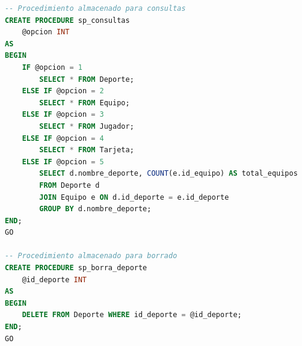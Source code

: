 \documentclass{article}
\begin{document}
\begin{lstlisting}[language=SQL]
-- Procedimiento almacenado para consultas
CREATE PROCEDURE sp_consultas
    @opcion INT
AS
BEGIN
    IF @opcion = 1
        SELECT * FROM Deporte;
    ELSE IF @opcion = 2
        SELECT * FROM Equipo;
    ELSE IF @opcion = 3
        SELECT * FROM Jugador;
    ELSE IF @opcion = 4
        SELECT * FROM Tarjeta;
    ELSE IF @opcion = 5
        SELECT d.nombre_deporte, COUNT(e.id_equipo) AS total_equipos
        FROM Deporte d
        JOIN Equipo e ON d.id_deporte = e.id_deporte
        GROUP BY d.nombre_deporte;
END;
GO

-- Procedimiento almacenado para borrado
CREATE PROCEDURE sp_borra_deporte
    @id_deporte INT
AS
BEGIN
    DELETE FROM Deporte WHERE id_deporte = @id_deporte;
END;
GO
\end{lstlisting}
\end{document}
